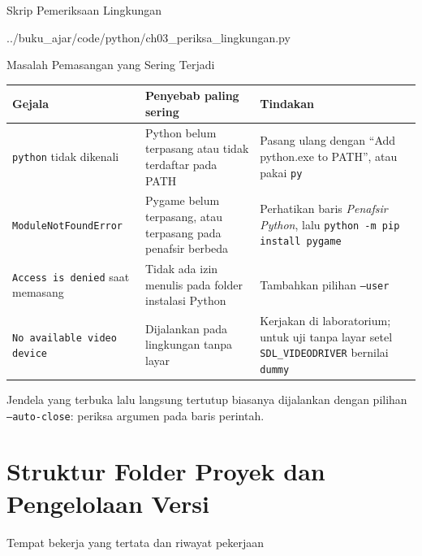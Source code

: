 \documentclass[aspectratio=169,10pt]{beamer}
\begin{document}
\begin{frame}[fragile]{Skrip Pemeriksaan Lingkungan}

  {../buku_ajar/code/python/ch03_periksa_lingkungan.py}
\end{frame}

\begin{frame}{Masalah Pemasangan yang Sering Terjadi}
{\scriptsize
\renewcommand{\arraystretch}{1.16}
\begin{tabularx}{\textwidth}{@{}>{\raggedright\arraybackslash}p{3.4cm}
    >{\raggedright\arraybackslash}p{3.7cm}
    >{\raggedright\arraybackslash}X@{}}
\toprule
\textbf{Gejala} & \textbf{Penyebab paling sering} & \textbf{Tindakan} \\
\midrule
\texttt{python} tidak dikenali &
  Python belum terpasang atau tidak terdaftar pada PATH &
  Pasang ulang dengan ``Add python.exe to PATH'', atau pakai \texttt{py} \\
\texttt{ModuleNotFoundError} &
  Pygame belum terpasang, atau terpasang pada penafsir berbeda &
  Perhatikan baris \emph{Penafsir Python}, lalu
  \texttt{python -m pip install pygame} \\
\texttt{Access is denied} saat memasang &
  Tidak ada izin menulis pada folder instalasi Python &
  Tambahkan pilihan \texttt{--user} \\
\texttt{No available video device} &
  Dijalankan pada lingkungan tanpa layar &
  Kerjakan di laboratorium; untuk uji tanpa layar setel
  \texttt{SDL\_VIDEODRIVER} bernilai \texttt{dummy} \\
\bottomrule
\end{tabularx}}
\vfill
\begin{kotak}
Jendela yang terbuka lalu langsung tertutup biasanya dijalankan dengan pilihan
\texttt{--auto-close}: periksa argumen pada baris perintah.
\end{kotak}
\end{frame}

\section{Struktur Folder Proyek dan Pengelolaan Versi}
  {Tempat bekerja yang tertata dan riwayat pekerjaan}
\end{document}
